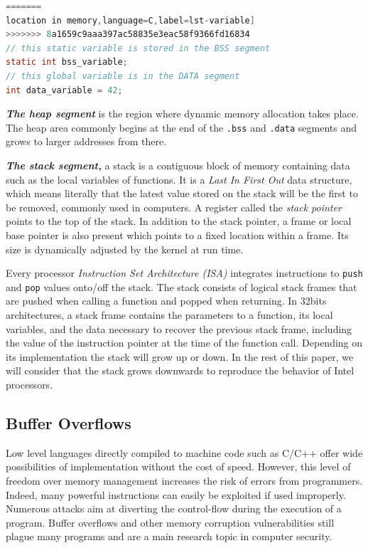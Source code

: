 \documentclass[10pt,twocolumn]{article}
\begin{document}
\begin{lstlisting}[aboveskip=\bigskipamount,belowskip=\medskipamount,caption=Variable
<<<<<<< HEAD
location in memory,language=C,label=lst-variable]
=======
location in memory,language=C,label=lst-variable] 
>>>>>>> 8a1659c9aaa397ac58835e3eac58f9366fd16834
// this static variable is stored in the BSS segment
static int bss_variable;
// this global variable is in the DATA segment
int data_variable = 42;
\end{lstlisting}

\textbf{\textit{The heap segment}} is the region where dynamic memory
allocation takes place. The heap area commonly begins at the end of the
\texttt{.bss} and \texttt{.data} segments and grows to larger addresses from
there.

\textit{\textbf{The stack segment,}} a stack is a contiguous block of memory
containing data such as the local variables of functions. It is a \textit{Last In First Out} data structure, which means
literally that the latest value stored on the stack will be the first to be
removed, commonly used
in computers. A register called the \textit{stack pointer} points to
the top of the stack. In addition to the stack pointer, a frame or local base
pointer is also present which points to a fixed location within a frame. Its
size is dynamically adjusted by the kernel at run time.

Every processor \textit{Instruction Set Architecture (ISA)} integrates
instructions to \texttt{push} and \texttt{pop} values onto/off the stack. The
stack consists of logical stack frames that are pushed when calling a function
and popped when returning. In 32bits architectures, a stack frame contains the
parameters to a function, its local variables, and the data necessary to
recover the previous stack frame, including the value of the instruction
pointer at the time of the function call. Depending on its implementation the
stack will grow up or down. In the rest of this paper, we will consider that
the stack grows downwards to reproduce the behavior of Intel processors.

\subsection{Buffer Overflows}

Low level languages directly compiled to machine code such as C/C++ offer wide
possibilities of implementation without the cost of speed. However, this level
of freedom over memory management increases the risk of errors from programmers.
Indeed, many powerful instructions can easily be exploited if used improperly.
Numerous attacks aim at diverting the control-flow during the execution of a
program. Buffer overflows and other memory corruption vulnerabilities still plague many programs and are a main research
topic in computer
security\cite{DBLP:journals/iee/MouzaraniSZ16,DBLP:journals/iee/PadmanabhuniT16,DBLP:conf/ant/LeonB16}.
\end{document}
